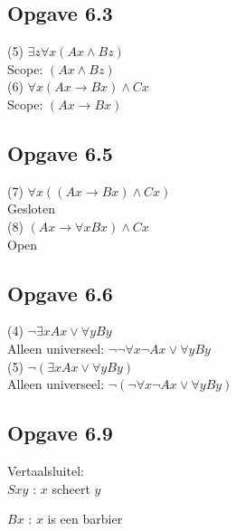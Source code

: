 \documentclass[11pt]{article}
\newcommand{\E}{\exists}
\newcommand{\A}{\forall}
\begin{document}
%

\subsection*{Opgave 6.3}

(5) $\E z\A x(Ax \wedge Bz)$ \\

Scope: $(Ax \wedge Bz)$ \\

(6) $\A x(Ax \rightarrow Bx) \wedge Cx$ \\

Scope: $(Ax \rightarrow Bx)$


\subsection*{Opgave 6.5}

(7) $\A x((Ax \rightarrow Bx) \wedge Cx)$ \\

Gesloten \\

(8) $(Ax \rightarrow \A xBx) \wedge Cx$ \\

Open \\


\subsection*{Opgave 6.6}

(4) $\neg \E xAx \vee \A yBy$ \\

Alleen universeel: $\neg \neg \A x \neg Ax \vee \A yBy$ \\

(5) $\neg (\E xAx \vee \A yBy)$ \\

Alleen universeel: $\neg (\neg \A x \neg Ax \vee \A yBy)$


\subsection*{Opgave 6.9}

Vertaalsluitel: \\

$Sxy$ : $x$ scheert $y$

$Bx$ : $x$ is een barbier
\end{document}
